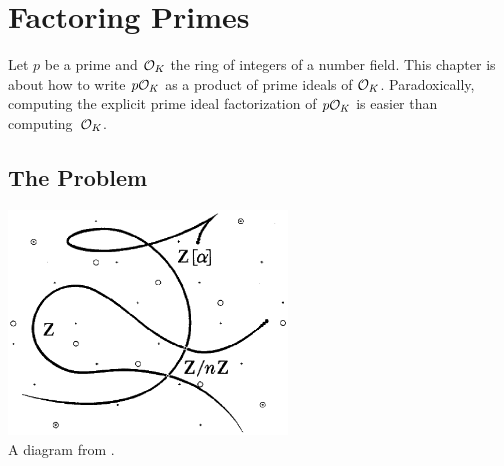 \chapter{Factoring Primes}\label{ch:factoring_primes}
Let $p$ be a prime and $\mathcal{O}_K$ the ring of integers of a number
field.  This chapter is about how to write $p\mathcal{O}_K$ as a product of
prime ideals of $\mathcal{O}_K$.  Paradoxically, computing the
explicit prime ideal factorization of $p\mathcal{O}_K$ is easier than
computing~$\mathcal{O}_K$.






\section{The Problem}
\begin{center}
\includegraphics[width=20em]{spec}\\
A diagram from \cite{lenstras:nfs}.
\end{center}

